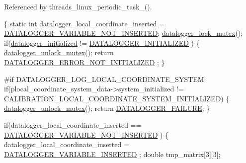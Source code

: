 Referenced by threads\-\_\-linux\-\_\-periodic\-\_\-task\-\_().


\begin{DoxyCode}
\{
    \textcolor{keyword}{static} \textcolor{keywordtype}{int} datalogger\_local\_coordinate\_inserted = 
      \hyperlink{datalogger_01_07Caio-PC's_01conflicted_01copy_012012-11-23_08_8h_a1f4fd2dbd981cf35467ab688c9157a74}{DATALOGGER\_VARIABLE\_NOT\_INSERTED};
    \hyperlink{datalogger_01_07Caio-PC's_01conflicted_01copy_012012-11-23_08_8c_a54b06d9395b2e370a5a72beb7f9524b2}{datalogger\_lock\_mutex}();
    \textcolor{keywordflow}{if}(\hyperlink{datalogger_01_07Caio-PC's_01conflicted_01copy_012012-11-23_08_8c_a35e8fbe04b90452afdc3c1be16ff6187}{datalogger\_initialized} != \hyperlink{datalogger_01_07Caio-PC's_01conflicted_01copy_012012-11-23_08_8h_a684c343d340004b77ca2b782934c96ca}{DATALOGGER\_INITIALIZED}
      )
    \{
        \hyperlink{datalogger_01_07Caio-PC's_01conflicted_01copy_012012-11-23_08_8c_a85453211c0c809083c36cc56b275aeeb}{datalogger\_unlock\_mutex}();
        \textcolor{keywordflow}{return} \hyperlink{datalogger_01_07Caio-PC's_01conflicted_01copy_012012-11-23_08_8h_a60df7fe0e61b757ad6a9db106b0eb43e}{DATALOGGER\_ERROR\_NOT\_INITIALIZED}
      ;
    \}

\textcolor{preprocessor}{    #if DATALOGGER\_LOG\_LOCAL\_COORDINATE\_SYSTEM}
\textcolor{preprocessor}{}    \textcolor{keywordflow}{if}(plocal\_coordinate\_system\_data->system\_initialized != 
      CALIBRATION\_LOCAL\_COORDINATE\_SYSTEM\_INITIALIZED)
        \{
        \hyperlink{datalogger_01_07Caio-PC's_01conflicted_01copy_012012-11-23_08_8c_a85453211c0c809083c36cc56b275aeeb}{datalogger\_unlock\_mutex}();
        \textcolor{keywordflow}{return} \hyperlink{datalogger_01_07Caio-PC's_01conflicted_01copy_012012-11-23_08_8h_ac52138ca42979f6e1f1d589020ff9f83}{DATALOGGER\_FAILURE};
        \}

    \textcolor{keywordflow}{if}(datalogger\_local\_coordinate\_inserted == \hyperlink{datalogger_01_07Caio-PC's_01conflicted_01copy_012012-11-23_08_8h_a1f4fd2dbd981cf35467ab688c9157a74}{DATALOGGER\_VARIABLE\_NOT\_INSERTED}
      )
    \{
        datalogger\_local\_coordinate\_inserted = \hyperlink{datalogger_01_07Caio-PC's_01conflicted_01copy_012012-11-23_08_8h_a181f9a0649abd26c74ed1a8a1710e25f}{DATALOGGER\_VARIABLE\_INSERTED}
      ;
        \textcolor{keywordtype}{double} tmp\_matrix[3][3];


\end{DoxyCode}
